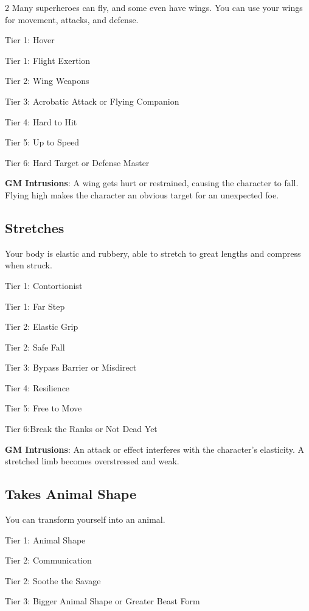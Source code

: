 \begin{multicols}{2}
Many superheroes can fly, and some even have wings. You can use your wings for movement, attacks, and defense.

Tier 1: Hover

Tier 1: Flight Exertion

Tier 2: Wing Weapons

Tier 3: Acrobatic Attack or Flying Companion

Tier 4: Hard to Hit 

Tier 5: Up to Speed 

Tier 6: Hard Target or Defense Master

\textbf{GM Intrusions}: A wing gets hurt or restrained, causing the character to fall. Flying high makes the character an obvious target for an unexpected foe.

\subsection{Stretches} 

Your body is elastic and rubbery, able to stretch to great lengths and compress when struck.

Tier 1: Contortionist

Tier 1: Far Step

Tier 2: Elastic Grip

Tier 2: Safe Fall

Tier 3: Bypass Barrier or Misdirect 

Tier 4: Resilience 

Tier 5: Free to Move 

Tier 6:Break the Ranks or Not Dead Yet

\textbf{GM Intrusions}: An attack or effect interferes with the character’s elasticity. A stretched limb becomes overstressed and weak.

\subsection{Takes Animal Shape} 

You can transform yourself into an animal. 

Tier 1: Animal Shape

Tier 2: Communication 

Tier 2: Soothe the Savage

Tier 3: Bigger Animal Shape or Greater Beast Form


\end{multicols}
